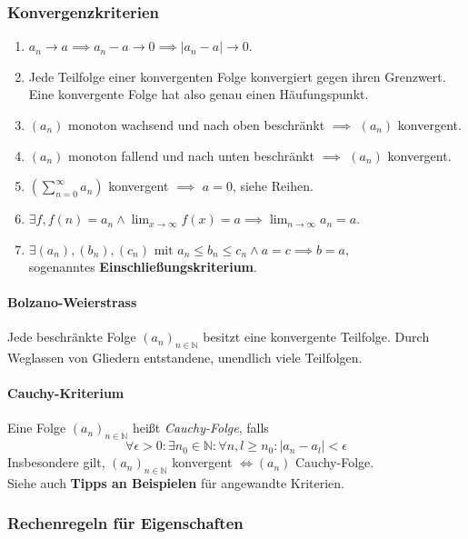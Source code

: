 \documentclass[a4paper, 9pt, DIV=24]{scrartcl}
\newcommand{\N}{\mathbb{N}}
\begin{document}
\subsubsection{Konvergenzkriterien}
\begin{enumerate}[label={(}\arabic*{)}]
\item $a_n \rightarrow a \implies a_n - a \rightarrow 0 \implies |a_n - a| \rightarrow 0$.
\item Jede Teilfolge einer konvergenten Folge konvergiert gegen ihren Grenzwert.
      Eine konvergente Folge hat also genau einen Häufungspunkt.
\item $(a_n)$ monoton wachsend und nach oben beschränkt $\implies$ $(a_n)$ konvergent.
\item $(a_n)$ monoton fallend und nach unten beschränkt $\implies$ $(a_n)$ konvergent.
\item $(\sum_{n=0}^{\infty} a_n)$ konvergent $\implies$ $a = 0$, siehe Reihen.
\item $\exists f, f(n) = a_n \wedge \lim_{x\rightarrow\infty} f(x) = a \implies \lim_{n\rightarrow\infty} a_n = a$.
\item $\exists (a_n), (b_n), (c_n) \text{ mit } a_n \leq b_n \leq c_n \wedge a = c \implies b = a,$\\
      sogenanntes \textbf{Einschließungskriterium}.
\end{enumerate}

\paragraph{Bolzano-Weierstrass}
Jede beschränkte Folge $(a_n)_{n \in \N }$ besitzt eine konvergente Teilfolge. Durch Weglassen von Gliedern entstandene, unendlich viele Teilfolgen. 
\paragraph{Cauchy-Kriterium}
Eine Folge $(a_n)_{n\in\N}$ heißt \emph{Cauchy-Folge}, falls
 \[ \forall \epsilon > 0: \exists n_0 \in\N: \forall n,l \geq n_0: |a_n - a_l| < \epsilon \]
Insbesondere gilt, $(a_n)_{n\in\N}$ konvergent $\iff (a_n)$ Cauchy-Folge.\\[.2em]
Siehe auch \textbf{Tipps an Beispielen} für angewandte Kriterien.

\subsubsection{Rechenregeln für Eigenschaften}
\end{document}
